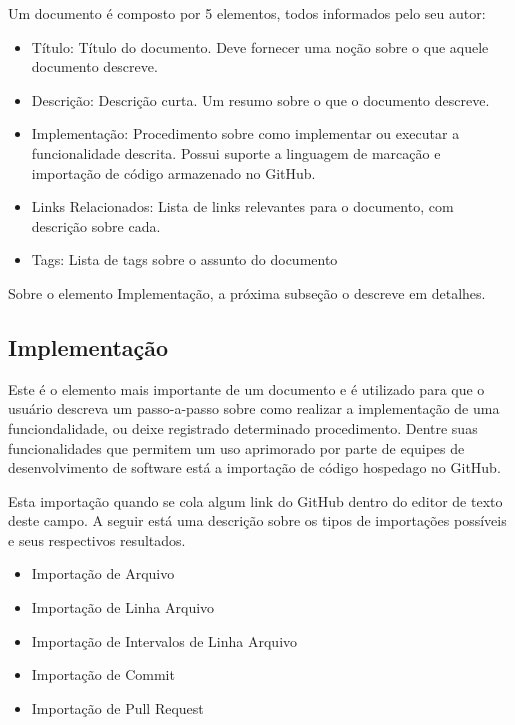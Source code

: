 Um documento é composto por 5 elementos, todos informados pelo seu autor:

\begin{itemize}
  \item Título: Título do documento. Deve fornecer uma noção sobre o que aquele documento descreve.
  \item Descrição: Descrição curta. Um resumo sobre o que o documento descreve.
  \item Implementação: Procedimento sobre como implementar ou executar a funcionalidade descrita. Possui suporte a linguagem de marcação e importação de código armazenado no GitHub.
  \item Links Relacionados: Lista de links relevantes para o documento, com descrição sobre cada.
  \item Tags: Lista de tags sobre o assunto do documento
\end{itemize}

Sobre o elemento Implementação, a próxima subseção o descreve em detalhes.

\subsection{Implementação}

Este é o elemento mais importante de um documento e é utilizado para que o usuário descreva um passo-a-passo sobre
como realizar a implementação de uma funciondalidade, ou deixe registrado determinado procedimento. Dentre suas funcionalidades que permitem um uso aprimorado por parte de equipes de desenvolvimento de software está a importação de código hospedago no GitHub.

Esta importação quando se cola algum link do GitHub dentro do editor de texto deste campo. A seguir está uma descrição sobre os tipos de importações possíveis e seus respectivos resultados.

\begin{itemize}
  \item Importação de Arquivo
  \item Importação de Linha Arquivo
  \item Importação de Intervalos de Linha Arquivo
  \item Importação de Commit
  \item Importação de Pull Request
\end{itemize}

